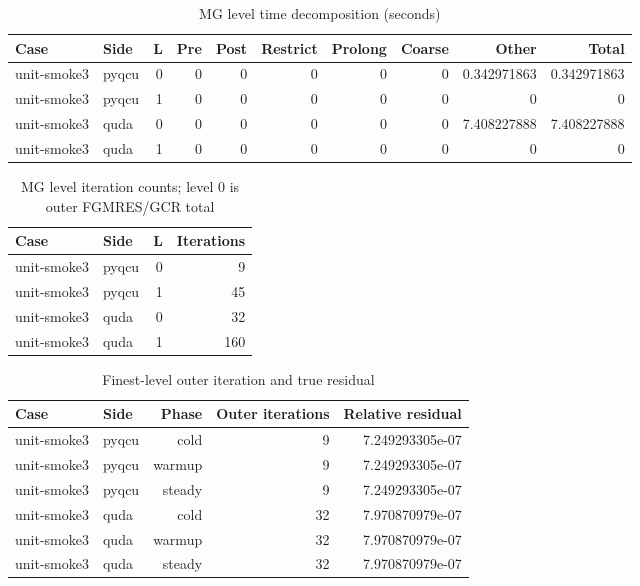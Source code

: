 
\begin{table}[htbp]
\centering
\caption{MG level time decomposition (seconds)}
\small
\begin{tabular}{@{}llrrrrrrrr@{}}
\toprule
Case & Side & L & Pre & Post & Restrict & Prolong & Coarse & Other & Total \\
\midrule
unit-smoke3 & pyqcu & 0 & 0 & 0 & 0 & 0 & 0 & 0.342971863 & 0.342971863 \\
unit-smoke3 & pyqcu & 1 & 0 & 0 & 0 & 0 & 0 & 0 & 0 \\
unit-smoke3 & quda & 0 & 0 & 0 & 0 & 0 & 0 & 7.408227888 & 7.408227888 \\
unit-smoke3 & quda & 1 & 0 & 0 & 0 & 0 & 0 & 0 & 0 \\
\bottomrule
\end{tabular}
\end{table}

\begin{table}[htbp]
\centering
\caption{MG level iteration counts; level 0 is outer FGMRES/GCR total}
\small
\begin{tabular}{@{}llrr@{}}
\toprule
Case & Side & L & Iterations \\
\midrule
unit-smoke3 & pyqcu & 0 & 9 \\
unit-smoke3 & pyqcu & 1 & 45 \\
unit-smoke3 & quda & 0 & 32 \\
unit-smoke3 & quda & 1 & 160 \\
\bottomrule
\end{tabular}
\end{table}

\begin{table}[htbp]
\centering
\caption{Finest-level outer iteration and true residual}
\small
\begin{tabular}{@{}llrrr@{}}
\toprule
Case & Side & Phase & Outer iterations & Relative residual \\
\midrule
unit-smoke3 & pyqcu & cold & 9 & 7.249293305e-07 \\
unit-smoke3 & pyqcu & warmup & 9 & 7.249293305e-07 \\
unit-smoke3 & pyqcu & steady & 9 & 7.249293305e-07 \\
unit-smoke3 & quda & cold & 32 & 7.970870979e-07 \\
unit-smoke3 & quda & warmup & 32 & 7.970870979e-07 \\
unit-smoke3 & quda & steady & 32 & 7.970870979e-07 \\
\bottomrule
\end{tabular}
\end{table}

